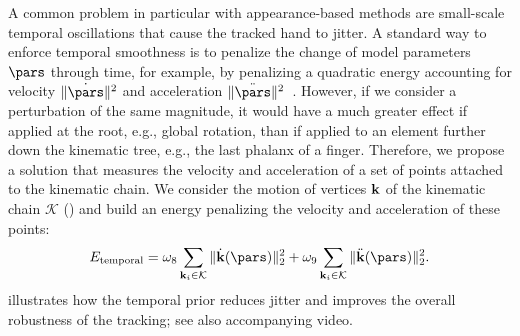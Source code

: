 A common problem in particular with appearance-based methods are small-scale temporal oscillations that cause the tracked hand to jitter. A standard way to enforce temporal smoothness is to penalize the change of model parameters~$\pars$ through time, for example, by penalizing a quadratic energy accounting for velocity $\|\dot \pars\|^2$ and acceleration $\|\ddot \pars\|^2$~\cite{wei_siga12}. 
% 
% 
However, if we consider a perturbation of the same magnitude, it would have a much greater effect if applied at the root, e.g., global rotation, than if applied to an element further down the kinematic tree, e.g., the last phalanx of a finger. 
Therefore, we propose a solution that measures the velocity and acceleration of a set of points attached to the kinematic chain. We consider the motion of vertices $\mathbf{k}$ of the kinematic chain $\mathcal{K}$ () and build an energy penalizing the velocity and acceleration of these points:
\begin{eqnarray}
    E_{\text{temporal}} = \omegatemporalst \sum_{\skelpoint_i \in \mathcal{K}} \| \dot \skelpoint(\pars) \|_2^2 + \omegatemporalnd \sum_{\skelpoint_i \in \mathcal{K}} \| \ddot \skelpoint(\pars) \|_2^2.
\end{eqnarray}
%
 illustrates how the temporal prior reduces jitter and improves the overall robustness of the tracking; see also accompanying video.




